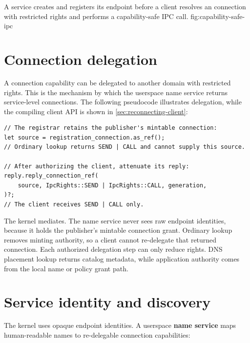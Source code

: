     {A service creates and registers its endpoint before a client resolves an
    connection with restricted rights and performs a capability-safe IPC call.}
    {fig:capability-safe-ipc}

\section{Connection delegation}

A connection capability can be delegated to another domain with restricted rights.
This is the mechanism by which the userspace name service returns service-level
connections. The following pseudocode illustrates delegation, while the compiling
client API is shown in \autoref{sec:reconnecting-client}:


\begin{lstlisting}[style=rustCode]
// The registrar retains the publisher's mintable connection:
let source = registration_connection.as_ref();
// Ordinary lookup returns SEND | CALL and cannot supply this source.

// After authorizing the client, attenuate its reply:
reply.reply_connection_ref(
    source, IpcRights::SEND | IpcRights::CALL, generation,
)?;
// The client receives SEND | CALL only.
\end{lstlisting}

The kernel mediates. The name service never sees raw endpoint identities, because it
holds the publisher's mintable connection grant. Ordinary lookup removes
minting authority, so a client cannot re-delegate that returned connection.
Each authorized delegation step can only reduce rights. DNS placement lookup
returns catalog metadata, while application authority comes from the local name or
policy grant path.

\section{Service identity and discovery}

The kernel uses opaque endpoint identities. A userspace \textbf{name service}
maps human-readable names to re-delegable connection capabilities:

